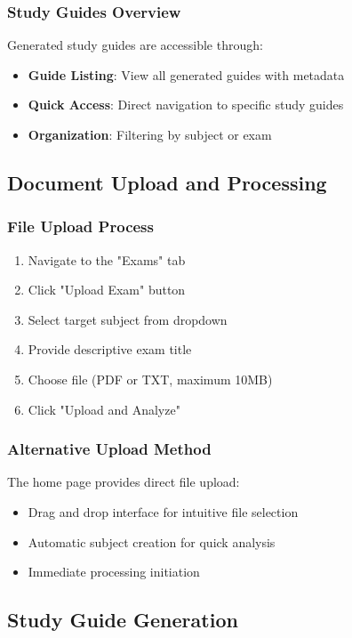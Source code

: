 \documentclass[conference]{IEEEtran}
\begin{document}
\subsubsection{Study Guides Overview}
Generated study guides are accessible through:
\begin{itemize}
\item \textbf{Guide Listing}: View all generated guides with metadata
\item \textbf{Quick Access}: Direct navigation to specific study guides
\item \textbf{Organization}: Filtering by subject or exam
\end{itemize}

\subsection{Document Upload and Processing}

\subsubsection{File Upload Process}
\begin{enumerate}
\item Navigate to the "Exams" tab
\item Click "Upload Exam" button
\item Select target subject from dropdown
\item Provide descriptive exam title
\item Choose file (PDF or TXT, maximum 10MB)
\item Click "Upload and Analyze"
\end{enumerate}

\subsubsection{Alternative Upload Method}
The home page provides direct file upload:
\begin{itemize}
\item Drag and drop interface for intuitive file selection
\item Automatic subject creation for quick analysis
\item Immediate processing initiation
\end{itemize}

\subsection{Study Guide Generation}
\end{document}
